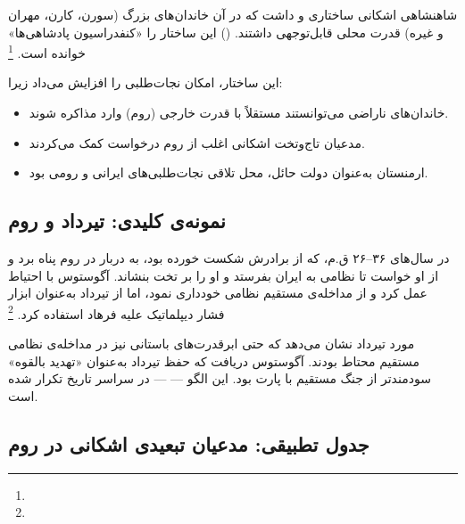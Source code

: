 شاهنشاهی اشکانی ساختاری  و  داشت که در آن خاندان‌های بزرگ (سورن، کارن، مهران و غیره) قدرت محلی قابل‌توجهی داشتند.  () این ساختار را «کنفدراسیون پادشاهی‌ها» خوانده است.%
\footnote{}

این ساختار، امکان نجات‌طلبی را افزایش می‌داد زیرا:
\begin{itemize}[nosep, rightmargin=1em]
  \item خاندان‌های ناراضی می‌توانستند مستقلاً با قدرت خارجی (روم) وارد مذاکره شوند.
  \item مدعیان تاج‌وتخت اشکانی اغلب از روم درخواست کمک می‌کردند.
  \item ارمنستان به‌عنوان دولت حائل، محل تلاقی نجات‌طلبی‌های ایرانی و رومی بود.
\end{itemize}

\subsection{نمونه‌ی کلیدی: تیرداد و روم}
\label{subsec:ch04-tiridates}

در سال‌های ۳۶–۲۶ ق.م،  که از برادرش  شکست خورده بود، به دربار  در روم پناه برد و از او خواست تا نظامی به ایران بفرستد و او را بر تخت بنشاند. آگوستوس با احتیاط عمل کرد و از مداخله‌ی مستقیم نظامی خودداری نمود، اما از تیرداد به‌عنوان ابزار فشار دیپلماتیک علیه فرهاد استفاده کرد.%
\footnote{}

\begin{tcolorbox}[defbox, title={درس تاریخی}]
مورد تیرداد نشان می‌دهد که حتی ابرقدرت‌های باستانی نیز در مداخله‌ی نظامی مستقیم محتاط بودند. آگوستوس دریافت که حفظ تیرداد به‌عنوان «تهدید بالقوه» سودمندتر از جنگ مستقیم با پارت بود. این الگو —  — در سراسر تاریخ تکرار شده است.
\end{tcolorbox}

\subsection{جدول تطبیقی: مدعیان تبعیدی اشکانی در روم}
\label{subsec:ch04-parthian-exiles}

